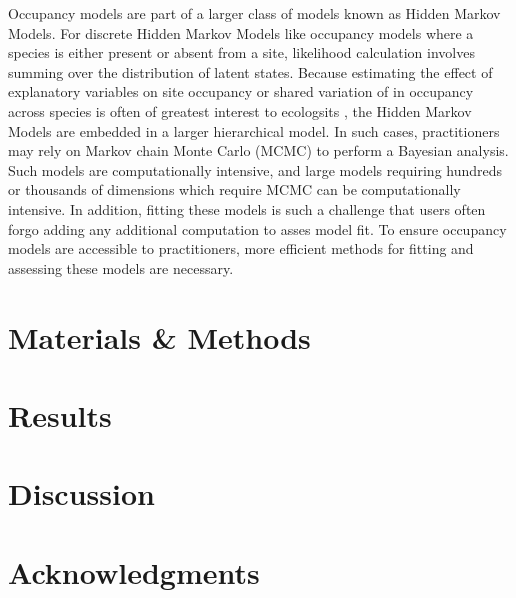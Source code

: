 \documentclass[12pt]{article}
\begin{document}
Occupancy models are part of a larger class of models known as Hidden
Markov Models. For discrete Hidden Markov Models like occupancy models
where a species is either present or absent from a site, likelihood
calculation involves summing over the distribution of latent
states. Because estimating the effect of explanatory variables on site
occupancy or shared variation of in occupancy across species is often
of greatest interest to ecologsits
\citep[e.g.,][]{iknayan2014detecting}, the Hidden Markov Models are
embedded in a larger hierarchical model. In such cases, practitioners
may rely on Markov chain Monte Carlo (MCMC) to perform a Bayesian
analysis. Such models are computationally intensive, and large models
requiring hundreds or thousands of dimensions which require MCMC can
be computationally intensive. In addition, fitting these models is
such a challenge that users often forgo adding any additional
computation to asses model fit. To ensure occupancy models are
accessible to practitioners, more efficient methods for fitting and
assessing these models are necessary.



\section*{Materials \& Methods}
\label{sec:methods}


\section*{Results}
\label{sec:results}

\section*{Discussion}
\label{sec:discussion}

\section*{Acknowledgments}
\label{sec:acknowledge}





\end{document}
